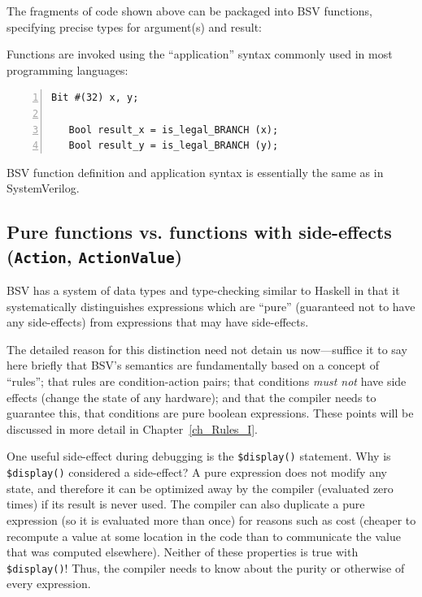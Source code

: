 
The fragments of code shown above can be packaged into BSV functions,
specifying precise types for argument(s) and result:






Functions are invoked using the ``application'' syntax commonly used
in most programming languages:

{\small
\begin{Verbatim}[frame=single, numbers=left]
   Bit #(32) x, y;

   Bool result_x = is_legal_BRANCH (x);
   Bool result_y = is_legal_BRANCH (y);
\end{Verbatim}
}

BSV function definition and application syntax is essentially the same
as in SystemVerilog.


\subsection{Pure functions vs. functions with side-effects ({\tt Action}, {\tt ActionValue})}

\label{Sec_Pure_vs_Side_Effect_functions}


BSV has a system of data types and type-checking similar to Haskell in
that it systematically distinguishes expressions which are ``pure''
(guaranteed not to have any side-effects) from expressions that may
have side-effects.

The detailed reason for this distinction need not detain us
now---suffice it to say here briefly that BSV's semantics are
fundamentally based on a concept of ``rules''; that rules are
condition-action pairs; that conditions \emph{must not} have side
effects (change the state of any hardware); and that the compiler
needs to guarantee this, {\ie} that conditions are pure boolean
expressions.  These points will be discussed in more detail in
Chapter~\ref{ch_Rules_I}.

One useful side-effect during debugging is the {\tt \$display()}
statement.  Why is {\tt \$display()} considered a side-effect?  A pure
expression does not modify any state, and therefore it can be
optimized away by the compiler (evaluated zero times) if its result is
never used.  The compiler can also duplicate a pure expression (so it
is evaluated more than once) for reasons such as cost (cheaper to
recompute a value at some location in the code than to communicate the
value that was computed elsewhere).  Neither of these properties is
true with {\tt \$display()}!  Thus, the compiler needs to know about
the purity or otherwise of every expression.

